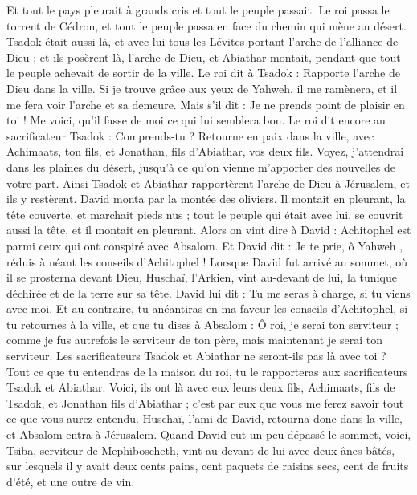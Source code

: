 \begin{multicols}{2}
Et tout le pays pleurait à grands cris et tout le peuple passait. Le roi passa le torrent de Cédron, et tout le peuple passa en face du chemin qui mène au désert.
Tsadok était aussi là, et avec lui tous les Lévites portant l'arche de l'alliance de Dieu ; et ils posèrent là, l'arche de Dieu, et Abiathar montait, pendant que tout le peuple achevait de sortir de la ville.
Le roi dit à Tsadok : Rapporte l'arche de Dieu dans la ville. Si je trouve grâce aux yeux de Yahweh, il me ramènera, et il me fera voir l’arche et sa demeure.
Mais s’il dit : Je ne prends point de plaisir en toi ! Me voici, qu'il fasse de moi ce qui lui semblera bon.
Le roi dit encore au sacrificateur Tsadok : Comprends-tu ? Retourne en paix dans la ville, avec Achimaats, ton fils, et Jonathan, fils d'Abiathar, vos deux fils.
Voyez, j’attendrai dans les plaines du désert, jusqu'à ce qu'on vienne m'apporter des nouvelles de votre part.
Ainsi Tsadok et Abiathar rapportèrent l'arche de Dieu à Jérusalem, et ils y restèrent.
David monta par la montée des oliviers. Il montait en pleurant, la tête couverte, et marchait pieds nus ; tout le peuple qui était avec lui, se couvrit aussi la tête, et il montait en pleurant.
Alors on vint dire à David : Achitophel est parmi ceux qui ont conspiré avec Absalom. Et David dit : Je te prie, ô Yahweh , réduis à néant les conseils d'Achitophel !
Lorsque David fut arrivé au sommet, où il se prosterna devant Dieu, Huschaï, l’Arkien, vint au-devant de lui, la tunique déchirée et de la terre sur sa tête.
David lui dit : Tu me seras à charge, si tu viens avec moi.
Et au contraire, tu anéantiras en ma faveur les conseils d’Achitophel, si tu retournes à la ville, et que tu dises à Absalom : Ô roi, je serai ton serviteur ; comme je fus autrefois le serviteur de ton père, mais maintenant je serai ton serviteur.
Les sacrificateurs Tsadok et Abiathar ne seront-ils pas là avec toi ? Tout ce que tu entendras de la maison du roi, tu le rapporteras aux sacrificateurs Tsadok et Abiathar.
Voici, ils ont là avec eux leurs deux fils, Achimaats, fils de Tsadok, et Jonathan fils d'Abiathar ; c’est par eux que vous me ferez savoir tout ce que vous aurez entendu.
Huschaï, l’ami de David, retourna donc dans la ville, et Absalom entra à Jérusalem.
\VerseOne{}Quand David eut un peu dépassé le sommet, voici, Tsiba, serviteur de Mephiboscheth, vint au-devant de lui avec deux ânes bâtés, sur lesquels il y avait deux cents pains, cent paquets de raisins secs, cent de fruits d'été, et une outre de vin.

\end{multicols}
